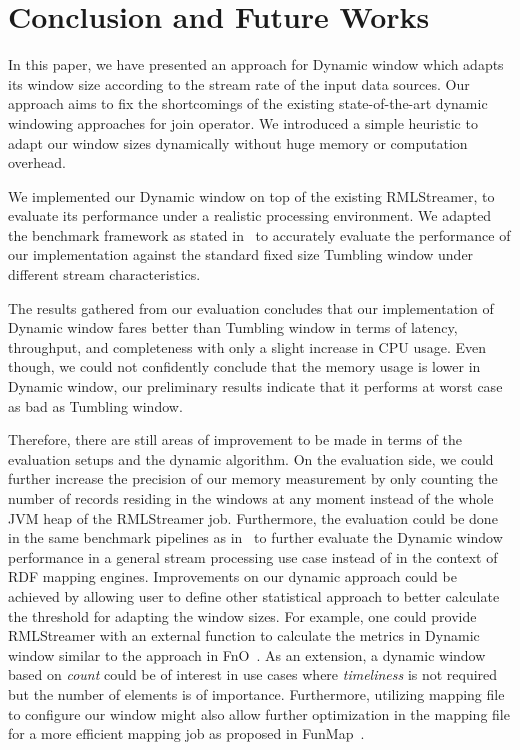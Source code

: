 \chapter{Conclusion and Future Works}%
\label{chap:Conclusion and Future Works}


In this paper, we have presented an approach for Dynamic window 
which adapts its window size according to the stream rate of the 
input data sources. Our approach aims to fix the shortcomings of 
the existing state-of-the-art dynamic windowing approaches for 
join operator. We introduced a simple heuristic to adapt our 
window sizes dynamically without huge memory or computation overhead. 

We implemented our Dynamic window on top of the existing RMLStreamer, 
to evaluate its performance under a realistic processing environment. 
We adapted the benchmark framework as stated in~\cite{evalution_of_spe} to 
accurately evaluate the performance of our implementation against the 
standard fixed size Tumbling window under different stream characteristics. 

The results gathered from our evaluation concludes that our implementation 
of Dynamic window fares better than Tumbling window in terms of 
latency, throughput, and completeness with only a slight 
increase in CPU usage. Even though, we could not confidently conclude that 
the memory usage is lower in Dynamic window, our preliminary results indicate 
that it performs at worst case as bad as Tumbling window.   

Therefore, there are still areas of improvement to be made in terms of the
evaluation setups
and the dynamic algorithm. On the evaluation side, we could further increase 
the precision of our memory measurement by only counting the number of records
residing in the windows at any moment instead of the whole JVM heap of the RMLStreamer job. 
Furthermore, the evaluation could be done in the same benchmark pipelines as in~\cite{evalution_of_spe} 
to further evaluate the Dynamic window performance in a general stream processing use case instead 
of in the context of RDF mapping engines.  
Improvements on our dynamic approach could be achieved by allowing user to 
define other statistical approach 
to better calculate the threshold for adapting the window sizes. For example, one could provide 
RMLStreamer with an external function to calculate the metrics in Dynamic window similar to the approach 
in FnO~\cite{fno_ben}.
As an extension, a dynamic window based on \emph{count} could be of interest in use 
cases where \emph{timeliness} is not required but the number of elements is of importance.
Furthermore, utilizing mapping file to configure our window might also allow further
optimization in the mapping file for a more efficient mapping job as proposed in FunMap~\cite{funmap}. 


